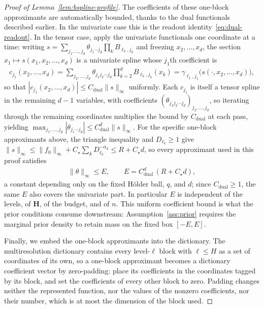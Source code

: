 \begin{proof}[Proof of Lemma~\ref{lem:bspline-profile}]
The coefficients of these one-block approximants are automatically bounded, thanks to the dual functionals described earlier. In the univariate case this is the readout identity~\eqref{eq:dual-readout}. In the tensor case, apply the univariate functionals one coordinate at a time: writing $s=\sum_{j_1,\ldots,j_d}\theta_{j_1\cdots j_d}\prod_kB_{\ell_k,j_k}$ and freezing $x_2,\ldots,x_d$, the section $x_1\mapsto s(x_1,x_2,\ldots,x_d)$ is a univariate spline whose $j_1$th coefficient is
\begin{align*}
c_{j_1}(x_2,\ldots,x_d)
=\sum_{j_2,\ldots,j_d}\theta_{j_1j_2\cdots j_d}\prod_{k=2}^dB_{\ell_k,j_k}(x_k)
=\gamma_{\ell_1,j_1}\bigl(s(\cdot,x_2,\ldots,x_d)\bigr),
\end{align*}
so that $|c_{j_1}(x_2,\ldots,x_d)|\leq C_{\mathrm{dual}}\|s\|_\infty$ uniformly. Each $c_{j_1}$ is itself a tensor spline in the remaining $d-1$ variables, with coefficients $(\theta_{j_1j_2\cdots j_d})_{j_2,\ldots,j_d}$, so iterating through the remaining coordinates multiplies the bound by $C_{\mathrm{dual}}$ at each pass, yielding $\max_{j_1,\ldots,j_d}|\theta_{j_1\cdots j_d}|\leq C_{\mathrm{dual}}^d\|s\|_\infty$. For the specific one-block approximants above, the triangle inequality and $D_{\ell_k}\geq1$ give $\|s\|_\infty\leq\|f_0\|_\infty+C_\star\sum_kD_{\ell_k}^{-\alpha_k}\leq R+C_\star d$, so every approximant used in this proof satisfies
\begin{align}
\|\theta\|_\infty\leq E,
\qquad E=C_{\mathrm{dual}}^d\,(R+C_\star d),
\label{eq:spline-E}
\end{align}
a constant depending only on the fixed H\"older ball, $q$, and $d$; since $C_{\mathrm{dual}}\geq1$, the same $E$ also covers the univariate part. In particular $E$ is independent of the levels, of $\boldsymbol H$, of the budget, and of $n$. This uniform coefficient bound is what the prior conditions consume downstream: Assumption~\ref{ass:prior} requires the marginal prior density to retain mass on the fixed box $[-E,E]$.

Finally, we embed the one-block approximants into the dictionary. The multiresolution dictionary contains every level-$\ell$ block with $\ell\leq H$ as a set of coordinates of its own, so a one-block approximant becomes a dictionary coefficient vector by zero-padding: place its coefficients in the coordinates tagged by its block, and set the coefficients of every other block to zero. Padding changes neither the represented function, nor the values of the nonzero coefficients, nor their number, which is at most the dimension of the block used.


\end{proof}
